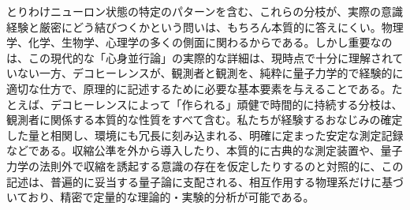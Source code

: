 とりわけニューロン状態の特定のパターンを含む、これらの分枝が、実際の意識経験と厳密にどう結びつくかという問いは、もちろん本質的に答えにくい。物理学、化学、生物学、心理学の多くの側面に関わるからである。しかし重要なのは、この現代的な「心身並行論」の実際的な詳細は、現時点で十分に理解されていない一方、デコヒーレンスが、観測者と観測を、純粋に量子力学的で経験的に適切な仕方で、原理的に記述するために必要な基本要素を与えることである。たとえば、デコヒーレンスによって「作られる」頑健で時間的に持続する分枝は、観測者に関係する本質的な性質をすべて含む。私たちが経験するおなじみの確定した量と相関し、環境にも冗長に刻み込まれる、明確に定まった安定な測定記録などである。収縮公準を外から導入したり、本質的に古典的な測定装置や、量子力学の法則外で収縮を誘起する意識の存在を仮定したりするのと対照的に、この記述は、普遍的に妥当する量子論に支配される、相互作用する物理系だけに基づいており、精密で定量的な理論的・実験的分析が可能である。

